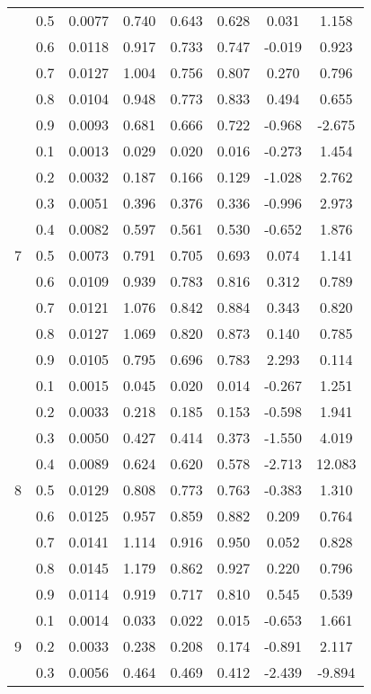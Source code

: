 \documentclass[11pt,a4paper]{report}
\begin{document}
\begin{longtable}{ | c | c || c | c | c | c | c | c | }
 & 0.5 & 0.0077 & 0.740 & 0.643 & 0.628 & 0.031 & 1.158 \\
 & 0.6 & 0.0118 & 0.917 & 0.733 & 0.747 & -0.019 & 0.923 \\
 & 0.7 & 0.0127 & 1.004 & 0.756 & 0.807 & 0.270 & 0.796 \\
 & 0.8 & 0.0104 & 0.948 & 0.773 & 0.833 & 0.494 & 0.655 \\
 & 0.9 & 0.0093 & 0.681 & 0.666 & 0.722 & -0.968 & -2.675 \\
 \hline
\multirow{9}{*}{7} & 0.1 & 0.0013 & 0.029 & 0.020 & 0.016 & -0.273 & 1.454 \\
 & 0.2 & 0.0032 & 0.187 & 0.166 & 0.129 & -1.028 & 2.762 \\
 & 0.3 & 0.0051 & 0.396 & 0.376 & 0.336 & -0.996 & 2.973 \\
 & 0.4 & 0.0082 & 0.597 & 0.561 & 0.530 & -0.652 & 1.876 \\
 & 0.5 & 0.0073 & 0.791 & 0.705 & 0.693 & 0.074 & 1.141 \\
 & 0.6 & 0.0109 & 0.939 & 0.783 & 0.816 & 0.312 & 0.789 \\
 & 0.7 & 0.0121 & 1.076 & 0.842 & 0.884 & 0.343 & 0.820 \\
 & 0.8 & 0.0127 & 1.069 & 0.820 & 0.873 & 0.140 & 0.785 \\
 & 0.9 & 0.0105 & 0.795 & 0.696 & 0.783 & 2.293 & 0.114 \\
 \hline
\multirow{9}{*}{8} & 0.1 & 0.0015 & 0.045 & 0.020 & 0.014 & -0.267 & 1.251 \\
 & 0.2 & 0.0033 & 0.218 & 0.185 & 0.153 & -0.598 & 1.941 \\
 & 0.3 & 0.0050 & 0.427 & 0.414 & 0.373 & -1.550 & 4.019 \\
 & 0.4 & 0.0089 & 0.624 & 0.620 & 0.578 & -2.713 & 12.083 \\
 & 0.5 & 0.0129 & 0.808 & 0.773 & 0.763 & -0.383 & 1.310 \\
 & 0.6 & 0.0125 & 0.957 & 0.859 & 0.882 & 0.209 & 0.764 \\
 & 0.7 & 0.0141 & 1.114 & 0.916 & 0.950 & 0.052 & 0.828 \\
 & 0.8 & 0.0145 & 1.179 & 0.862 & 0.927 & 0.220 & 0.796 \\
 & 0.9 & 0.0114 & 0.919 & 0.717 & 0.810 & 0.545 & 0.539 \\
 \hline
\multirow{9}{*}{9} & 0.1 & 0.0014 & 0.033 & 0.022 & 0.015 & -0.653 & 1.661 \\
 & 0.2 & 0.0033 & 0.238 & 0.208 & 0.174 & -0.891 & 2.117 \\
 & 0.3 & 0.0056 & 0.464 & 0.469 & 0.412 & -2.439 & -9.894 \\

\end{longtable}
\end{document}
